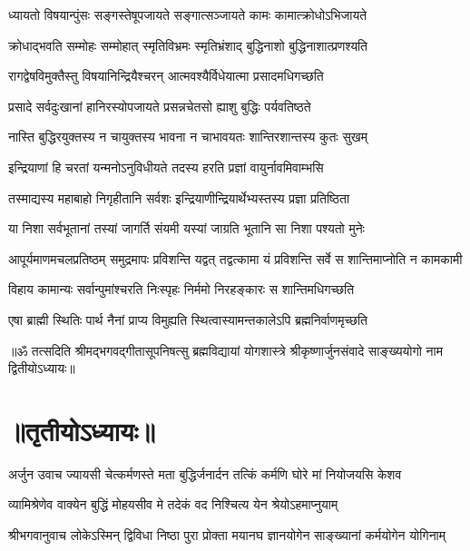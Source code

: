 \twolineshloka
{ध्यायतो विषयान्पुंसः सङ्गस्तेषूपजायते}
{सङ्गात्सञ्जायते कामः कामात्क्रोधोऽभिजायते}%

\twolineshloka
{क्रोधाद्भवति सम्मोहः सम्मोहात् स्मृतिविभ्रमः}
{स्मृतिभ्रंशाद् बुद्धिनाशो बुद्धिनाशात्प्रणश्यति}%

\twolineshloka
{रागद्वेषविमुक्तैस्तु विषयानिन्द्रियैश्चरन्}
{आत्मवश्यैर्विधेयात्मा प्रसादमधिगच्छति}%

\twolineshloka
{प्रसादे सर्वदुःखानां हानिरस्योपजायते}
{प्रसन्नचेतसो ह्याशु बुद्धिः पर्यवतिष्ठते}%

\twolineshloka
{नास्ति बुद्धिरयुक्तस्य न चायुक्तस्य भावना}
{न चाभावयतः शान्तिरशान्तस्य कुतः सुखम्}%

\twolineshloka
{इन्द्रियाणां हि चरतां यन्मनोऽनुविधीयते}
{तदस्य हरति प्रज्ञां वायुर्नावमिवाम्भसि}%

\twolineshloka
{तस्माद्यस्य महाबाहो निगृहीतानि सर्वशः}
{इन्द्रियाणीन्द्रियार्थेभ्यस्तस्य प्रज्ञा प्रतिष्ठिता}%

\twolineshloka
{या निशा सर्वभूतानां तस्यां जागर्ति संयमी}
{यस्यां जाग्रति भूतानि सा निशा पश्यतो मुनेः}%

\fourlineindentedshloka
{आपूर्यमाणमचलप्रतिष्ठम्}
{समुद्रमापः प्रविशन्ति यद्वत्}
{तद्वत्कामा यं प्रविशन्ति सर्वे}
{स शान्तिमाप्नोति न कामकामी}%

\twolineshloka
{विहाय कामान्यः सर्वान्पुमांश्चरति निःस्पृहः}
{निर्ममो निरहङ्कारः स शान्तिमधिगच्छति}%

\twolineshloka
{एषा ब्राह्मी स्थितिः पार्थ नैनां प्राप्य विमुह्यति}
{स्थित्वास्यामन्तकालेऽपि ब्रह्मनिर्वाणमृच्छति}%

{॥ॐ तत्सदिति श्रीमद्भगवद्गीतासूपनिषत्सु ब्रह्मविद्यायां योगशास्त्रे श्रीकृष्णार्जुनसंवादे साङ्ख्ययोगो नाम द्वितीयोऽध्यायः॥}

\section{॥तृतीयोऽध्यायः॥}

{अर्जुन उवाच}
\twolineshloka
{ज्यायसी चेत्कर्मणस्ते मता बुद्धिर्जनार्दन}
{तत्किं कर्मणि घोरे मां नियोजयसि केशव}%

\twolineshloka
{व्यामिश्रेणेव वाक्येन बुद्धिं मोहयसीव मे}
{तदेकं वद निश्चित्य येन श्रेयोऽहमाप्नुयाम्}%

{श्रीभगवानुवाच}
\twolineshloka
{लोकेऽस्मिन् द्विविधा निष्ठा पुरा प्रोक्ता मयानघ}
{ज्ञानयोगेन साङ्ख्यानां कर्मयोगेन योगिनाम्}%

